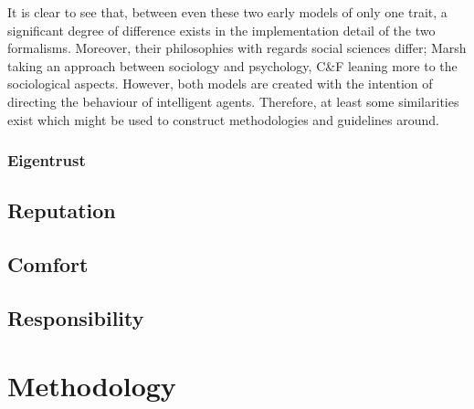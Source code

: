It is clear to see that, between even these two early models of only one trait, a significant degree of difference exists in the implementation detail of the two formalisms. Moreover, their philosophies with regards social sciences differ; Marsh taking an approach between sociology and psychology, C\&F leaning more to the sociological aspects. However, both models are created with the intention of directing the behaviour of intelligent agents. Therefore, at least some similarities exist which might be used to construct methodologies and guidelines around.\par

\subsubsection*{Eigentrust}\label{sec:eigentrust}


\subsection*{Reputation}

\subsection*{Comfort}

\subsection*{Responsibility}


\section{Methodology}
\label{sec:methodology}








